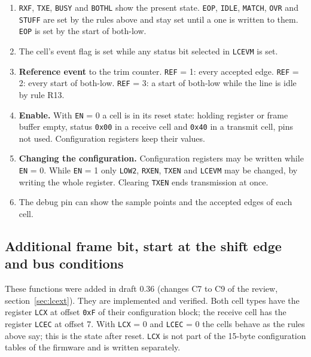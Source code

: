 \documentclass[10pt,a4paper]{article}
\newcommand{\reg}[1]{\texttt{#1}}
\begin{document}
\begin{enumerate}[label=\textbf{S\arabic*},leftmargin=2.6em]
\item \reg{RXF}, \reg{TXE}, \reg{BUSY} and \reg{BOTHL} show the present state. \reg{EOP}, \reg{IDLE}, \reg{MATCH}, \reg{OVR}
and \reg{STUFF} are set by the rules above and stay set until a one is written to them. \reg{EOP} is set by the start of both-low.
\item The cell's event flag is set while any status bit selected in \reg{LCEVM} is set.
\item \textbf{Reference event} to the trim counter. \reg{REF} = 1: every accepted edge. \reg{REF} = 2: every start of
both-low. \reg{REF} = 3: a start of both-low while the line is idle by rule R13.
\item \textbf{Enable.} With \reg{EN} = 0 a cell is in its reset state: holding register or frame buffer empty, status \texttt{0x00} in a receive cell and \texttt{0x40} in a transmit cell, pins not used. Configuration registers keep their values.
\item \textbf{Changing the configuration.} Configuration registers may be written while \reg{EN} = 0. While \reg{EN} = 1 only \reg{LOW2}, \reg{RXEN}, \reg{TXEN} and \reg{LCEVM} may be changed, by writing the whole register. Clearing \reg{TXEN} ends
transmission at once.
\item The debug pin can show the sample points and the accepted edges of each cell.
\end{enumerate}

\subsection{Additional frame bit, start at the shift edge and bus conditions}\label{sec:lcx}

These functions were added in draft 0.36 (changes C7 to C9 of the review, section~\ref{sec:lcext}). They are
implemented and verified. Both cell types have the register \reg{LCX} at offset \texttt{0xF} of their
configuration block; the receive cell has the register \reg{LCEC} at offset 7. With \reg{LCX} = 0 and
\reg{LCEC} = 0 the cells behave as the rules above say; this is the state after reset. \reg{LCX} is not part of
the 15-byte configuration tables of the firmware and is written separately.
\end{document}
